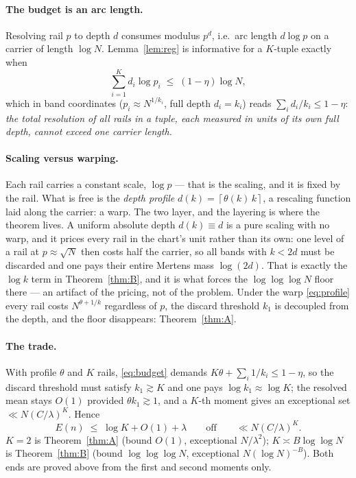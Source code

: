 \documentclass[11pt]{article}
\newcommand{\cl}[1]{\left\lceil #1\right\rceil}
\begin{document}
\paragraph{The budget is an arc length.}
Resolving rail $p$ to depth $d$ consumes modulus $p^{d}$, i.e.\ arc length $d\log p$ on a
carrier of length $\log N$.  Lemma~\ref{lem:reg} is informative for a $K$-tuple exactly
when
\begin{equation}\label{eq:budget}
\sum_{i=1}^{K}d_i\log p_i\;\le\;(1-\eta)\log N,
\end{equation}
which in band coordinates ($p_i\approx N^{1/k_i}$, full depth $d_i=k_i$) reads
$\sum_i d_i/k_i\le1-\eta$: \emph{the total resolution of all rails in a tuple, each
measured in units of its own full depth, cannot exceed one carrier length.}

\paragraph{Scaling versus warping.}
Each rail carries a constant scale, $\log p$ --- that is the scaling, and it is fixed by
the rail.  What is free is the \emph{depth profile} $d(k)=\cl{\theta(k)\,k}$, a rescaling
function laid along the carrier: a warp.  The two layer, and the layering is where the
theorem lives.  A uniform absolute depth $d(k)\equiv d$ is a pure scaling with no warp,
and it prices every rail in the chart's unit rather than its own: one level of a rail at
$p\approx\sqrt N$ then costs half the carrier, so all bands with $k<2d$ must be discarded
and one pays their entire Mertens mass $\log(2d)$.  That is exactly the $\log k$ term in
Theorem~\ref{thm:B}, and it is what forces the $\log\log\log N$ floor there --- an artifact
of the pricing, not of the problem.  Under the warp \eqref{eq:profile} every rail costs
$N^{\theta+1/k}$ regardless of $p$, the discard threshold $k_1$ is decoupled from the
depth, and the floor disappears: Theorem~\ref{thm:A}.

\paragraph{The trade.}
With profile $\theta$ and $K$ rails, \eqref{eq:budget} demands
$K\theta+\sum_i 1/k_i\le1-\eta$, so the discard threshold must satisfy $k_1\gtrsim K$ and
one pays $\log k_1\approx\log K$; the resolved mean stays $O(1)$ provided $\theta k_1\gtrsim1$,
and a $K$-th moment gives an exceptional set $\ll N(C/\lambda)^{K}$.  Hence
\[
E(n)\;\le\;\log K+O(1)+\lambda\qquad\text{off}\qquad \ll N(C/\lambda)^{K}.
\]
$K=2$ is Theorem~\ref{thm:A} (bound $O(1)$, exceptional $N/\lambda^{2}$);
$K\asymp B\log\log N$ is Theorem~\ref{thm:B} (bound $\log\log\log N$, exceptional
$N(\log N)^{-B}$).  Both ends are proved above from the first and second moments only.
\end{document}
